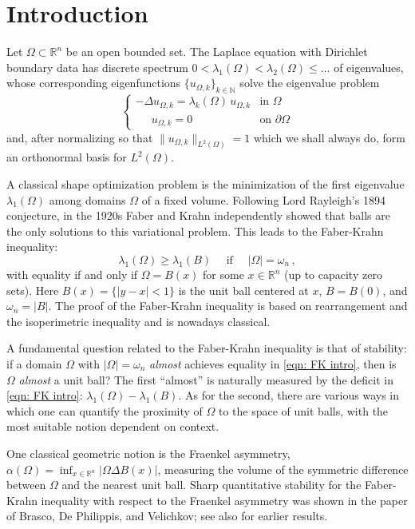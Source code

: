 \documentclass[10pt,a4paper]{amsart}
\numberwithin{equation}{section}
\def\R{{\mathbb R}}
\def\W{\Omega}
\def\om{\omega}
\begin{document}
\section{Introduction}
Let  $\Omega \subset \R^n$ be an open bounded set. The Laplace equation with Dirichlet boundary data has  discrete spectrum $0 < \lambda_1(\W) <  \lambda_2(\W) \leq \dots$ of eigenvalues, whose corresponding eigenfunctions $\{ u_{\W, k} \}_{k \in \mathbb{N}}$ solve the eigenvalue problem
\[
\begin{cases}
    -\Delta u_{\W,k} = \lambda_k(\W) \, u_{\W,k} & \text {in } \W\\
  \quad \ \   u_{\W,k} = 0 & \text{on } \partial \W
\end{cases}
\]
and, after normalizing so that $\| u_{\W,k}\|_{L^2(\W)} = 1$ which we shall always do,  form an orthonormal basis for $L^2(\W)$. 

A classical shape optimization problem is the minimization of the first eigenvalue $\lambda_1(\W)$ among domains $\W$ of a fixed volume. Following Lord Rayleigh's 1894 conjecture, in the 1920s Faber \cite{Faber23} and Krahn \cite{Krahn25} independently showed that balls are the only solutions to this variational problem. This leads to the Faber-Krahn inequality:
\begin{equation}\label{eqn: FK intro}
    \lambda_1(\W ) \geq \lambda_1(B)  \quad \text{ if } \quad|\W| = \omega_n\,,
\end{equation}
with equality if and only if $\W = B(x)$ for some $x\in \R^n$ (up to capacity zero sets).
Here $B(x) = \{|y-x|<1\}$ is the unit ball centered at $x$,  $B= B(0)$, and $\om_n = |B|$. The proof of the Faber-Krahn inequality is based on rearrangement and the isoperimetric inequality and  is nowadays classical.

A fundamental question related to the Faber-Krahn inequality is that of stability: if a domain $\W$ with $|\W| = \omega_n$ {\it almost} achieves equality in \eqref{eqn: FK intro}, then is $\W$ {\it almost} a unit ball? The first ``almost'' is naturally measured by the deficit in \eqref{eqn: FK intro}: $\lambda_1(\W)  - \lambda_1(B)$. As for the second,  there are various ways in which one can quantify the proximity of $\W$ to the space of unit balls,  with the most suitable  notion dependent on context.

One classical geometric notion is the Fraenkel asymmetry, $\alpha(\W) = \inf_{x \in \R^n} |\W\Delta B(x)|$, measuring the volume of the symmetric difference between $\W$ and the nearest unit ball. Sharp quantitative stability for the Faber-Krahn inequality with respect to the Fraenkel asymmetry was shown  in the paper \cite{BDV15} of Brasco, De Philippis, and Velichkov;  see also \cite{Bhat01, FMP09} for earlier results.
\end{document}
